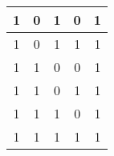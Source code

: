 \documentclass[a4paper]{article}
\begin{document}
\begin{table}[!ht]
\begin{tabular}{ccccc}
		1                                    & 0                                    & 1                                    & 0                                    & 1               \\ \hline
		1                                    & 0                                    & 1                                    & 1                                    & 1               \\ \hline
		1                                    & 1                                    & 0                                    & 0                                    & 1               \\ \hline
		1                                    & 1                                    & 0                                    & 1                                    & 1               \\ \hline
		1                                    & 1                                    & 1                                    & 0                                    & 1               \\ \hline
		1                                    & 1                                    & 1                                    & 1                                    & 1               \\ \hline
	\end{tabular}
\end{table}
\end{document}
